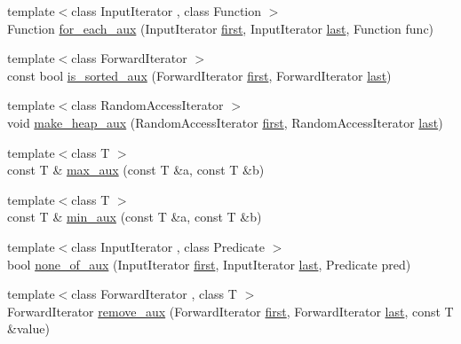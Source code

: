 \begin{DoxyCompactItemize}
\item 
{\footnotesize template$<$class Input\+Iterator , class Function $>$ }\\Function \hyperlink{namespaceprism_a9adcafd2357df71bd906d85ffe9fdf85}{for\+\_\+each\+\_\+aux} (Input\+Iterator \hyperlink{namespaceprism_ae3fb7a1926a9e8e59300cd5e370470da}{first}, Input\+Iterator \hyperlink{namespaceprism_abe4956c4e865f55ca126b7fb973b5078}{last}, Function func)
\item 
{\footnotesize template$<$class Forward\+Iterator $>$ }\\const bool \hyperlink{namespaceprism_a29c1478cf9a6f78fa511d96f93b22791}{is\+\_\+sorted\+\_\+aux} (Forward\+Iterator \hyperlink{namespaceprism_ae3fb7a1926a9e8e59300cd5e370470da}{first}, Forward\+Iterator \hyperlink{namespaceprism_abe4956c4e865f55ca126b7fb973b5078}{last})
\item 
{\footnotesize template$<$class Random\+Access\+Iterator $>$ }\\void \hyperlink{namespaceprism_a567b63d0d3fa2bc8bdba883f152848be}{make\+\_\+heap\+\_\+aux} (Random\+Access\+Iterator \hyperlink{namespaceprism_ae3fb7a1926a9e8e59300cd5e370470da}{first}, Random\+Access\+Iterator \hyperlink{namespaceprism_abe4956c4e865f55ca126b7fb973b5078}{last})
\item 
{\footnotesize template$<$class T $>$ }\\const T \& \hyperlink{namespaceprism_a9d5ae6f65d12dcb2e433ffdc95b733bb}{max\+\_\+aux} (const T \&a, const T \&b)
\item 
{\footnotesize template$<$class T $>$ }\\const T \& \hyperlink{namespaceprism_a5ded05d282e95b0ab21c6aeaca2e8794}{min\+\_\+aux} (const T \&a, const T \&b)
\item 
{\footnotesize template$<$class Input\+Iterator , class Predicate $>$ }\\bool \hyperlink{namespaceprism_a4333d241a3ee0f8bce307db84c7eba23}{none\+\_\+of\+\_\+aux} (Input\+Iterator \hyperlink{namespaceprism_ae3fb7a1926a9e8e59300cd5e370470da}{first}, Input\+Iterator \hyperlink{namespaceprism_abe4956c4e865f55ca126b7fb973b5078}{last}, Predicate pred)
\item 
{\footnotesize template$<$class Forward\+Iterator , class T $>$ }\\Forward\+Iterator \hyperlink{namespaceprism_acb7d8d4b86592081686e15ee7a18f856}{remove\+\_\+aux} (Forward\+Iterator \hyperlink{namespaceprism_ae3fb7a1926a9e8e59300cd5e370470da}{first}, Forward\+Iterator \hyperlink{namespaceprism_abe4956c4e865f55ca126b7fb973b5078}{last}, const T \&value)

\end{DoxyCompactItemize}
